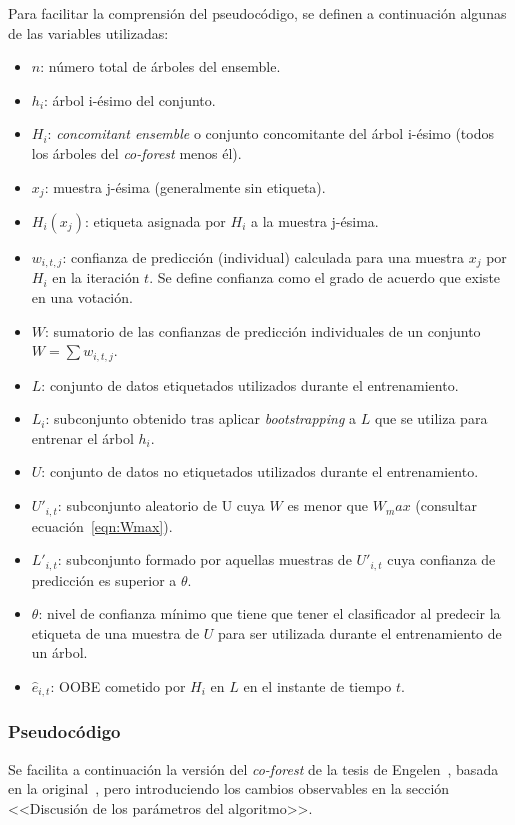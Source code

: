 Para facilitar la comprensión del pseudocódigo, se definen a continuación algunas de las variables utilizadas:
\begin{itemize}
	\item $n$: número total de árboles del ensemble.
	\item $h_{i}$: árbol i-ésimo del conjunto.
	\item $H_{i}$: \textit{concomitant ensemble} o conjunto concomitante del árbol i-ésimo (todos los árboles del \textit{co-forest} menos él).
	\item $x_j$: muestra j-ésima (generalmente sin etiqueta).
	\item $H_i(x_j)$: etiqueta asignada por $H_i$ a la muestra j-ésima.
	\item $w_{i,t,j}$: confianza de predicción (individual) calculada para una muestra $x_j$ por $H_{i}$ en la iteración $t$. Se define confianza como el grado de acuerdo que existe en una votación. 
	\item $W$: sumatorio de las confianzas de predicción individuales de un conjunto $W = \sum w_{i,t,j}$.
	\item $L$: conjunto de datos etiquetados utilizados durante el entrenamiento.
	\item $L_{i}$: subconjunto obtenido tras aplicar \textit{bootstrapping} a $L$ que se utiliza para entrenar el árbol $h_{i}$.
	\item $U$: conjunto de datos no etiquetados utilizados durante el entrenamiento.
	\item $U'_{i,t}$: subconjunto aleatorio de U cuya $W$ es menor que $W_max$ (consultar ecuación~\ref{eqn:Wmax}).
	\item $L'_{i,t}$: subconjunto formado por aquellas muestras de $U'_{i,t}$ cuya confianza de predicción es superior a $\theta$.
	\item $\theta$: nivel de confianza mínimo que tiene que tener el clasificador al predecir la etiqueta de una muestra de $U$ para ser utilizada durante el entrenamiento de un árbol.
	\item $\hat{e}_{i,t}$: OOBE cometido por $H_{i}$ en $L$ en el instante de tiempo $t$.
\end{itemize} 

\subsubsection{Pseudocódigo}

Se facilita a continuación la versión del \textit{co-forest} de la tesis de Engelen~\cite{engelen2018thesis}, basada en la original~\cite{originalCoForest2007}, pero introduciendo los cambios observables en la sección <<Discusión de los parámetros del algoritmo>>.

